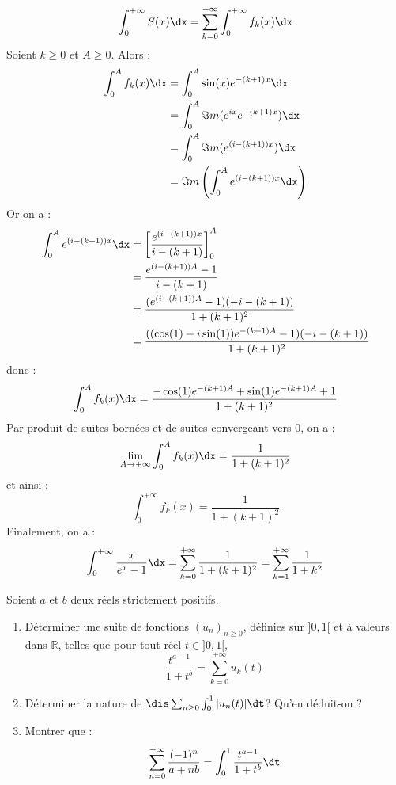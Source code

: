 \documentclass[a4paper,10pt]{report}
\begin{document}
$$ \int_0^{+ \infty} S(x) \dx = \sum_{k=0}^{+ \infty} \int_0^{+ \infty} f_k(x) \dx$$
Soient $k \geq 0$ et $A \geq 0$. Alors :
\begin{align*}
\int_0^A f_k(x) \dx &  = \int_0^A \sin(x) e^{-(k+1)x} \dx \\
& = \int_0^A \Im m(e^{ix}  e^{-(k+1)x}) \dx \\
& = \int_0^A \Im m(e^{(i-(k+1))x}) \dx \\
& = \Im m  \left(  \int_0^A e^{(i-(k+1))x} \dx \right) \\
\end{align*}
Or on a :
\begin{align*}
\int_0^A e^{(i-(k+1))x} \dx & = \left[ \dfrac{e^{(i-(k+1))x}}{i-(k+1)} \right]_0^A \\
& = \dfrac{e^{(i-(k+1))A} - 1}{i-(k+1)} \\
& = \dfrac{(e^{(i-(k+1))A} - 1)(-i-(k+1))}{1+(k+1)^2} \\
& = \dfrac{((\cos(1)+i \sin(1))e^{-(k+1)A} - 1)(-i-(k+1))}{1+(k+1)^2} 
\end{align*}
donc :
$$\int_0^A f_k(x) \dx = \dfrac{-\cos(1)e^{-(k+1)A}+ \sin(1)e^{-(k+1)A}+1}{1+(k+1)^2}$$
Par produit de suites bornées et de suites convergeant vers $0$, on a :
$$ \lim_{A \rightarrow + \infty} \int_0^A f_k(x) \dx = \dfrac{1}{1+(k+1)^2}$$
et ainsi :
$$ \int_0^{+ \infty} f_k(x)  = \dfrac{1}{1+(k+1)^2}$$
Finalement, on a :
$$ \int_0^{+ \infty} \dfrac{x}{e^x-1} \dx = \sum_{k=0}^{+ \infty} \dfrac{1}{1+(k+1)^2} =  \sum_{k=1}^{+ \infty} \dfrac{1}{1+k^2}$$

\begin{Exa} Soient $a$ et $b$ deux réels strictement positifs.
\begin{enumerate}
\item Déterminer une suite de fonctions $(u_n)_{n \geq 0}$, définies sur $]0,1[$ et à valeurs dans $\mathbb{R}$, telles que pour tout réel $t \in ]0,1[$,
$$ \dfrac{t^{a-1}}{1+t^b} = \sum_{k=0}^{+ \infty} u_k(t)$$
\item Déterminer la nature de $\dis \sum_{n \geq 0} \int_0^1 \vert u_n(t) \vert \dt$? Qu'en déduit-on ?
\item Montrer que :
$$ \sum_{n=0}^{+ \infty} \dfrac{(-1)^n}{a+nb} = \int_0^1 \dfrac{t^{a-1}}{1+t^b} \dt$$
\end{enumerate}
\end{Exa}

\corr 
\end{document}
